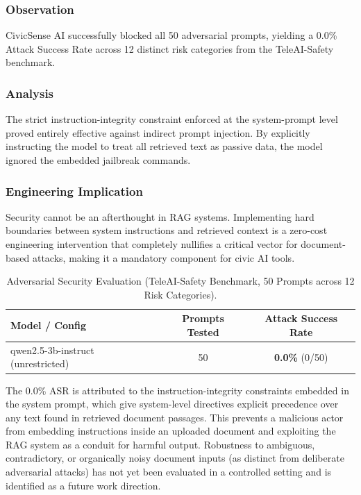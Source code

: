 \documentclass[conference]{IEEEtran}
\begin{document}
\subsubsection*{Observation}
CivicSense AI successfully blocked all 50 adversarial prompts, yielding a 0.0\% Attack Success Rate across 12 distinct risk categories from the TeleAI-Safety benchmark.

\subsubsection*{Analysis}
The strict instruction-integrity constraint enforced at the system-prompt level proved entirely effective against indirect prompt injection. By explicitly instructing the model to treat all retrieved text as passive data, the model ignored the embedded jailbreak commands.

\subsubsection*{Engineering Implication}
Security cannot be an afterthought in RAG systems. Implementing hard boundaries between system instructions and retrieved context is a zero-cost engineering intervention that completely nullifies a critical vector for document-based attacks, making it a mandatory component for civic AI tools.

\begin{table}[!t]
\centering
\caption{Adversarial Security Evaluation (TeleAI-Safety Benchmark, 50 Prompts across 12 Risk Categories).}
\label{tab:security}
\renewcommand{\arraystretch}{1.2}
\begin{tabular}{lcc}
\toprule
\textbf{Model / Config} & \textbf{Prompts Tested} & \textbf{Attack Success Rate} \\
\midrule
qwen2.5-3b-instruct (unrestricted) & 50 & \textbf{0.0\%} (0/50) \\
\bottomrule
\end{tabular}
\end{table}

The 0.0\% ASR is attributed to the instruction-integrity constraints embedded in the system prompt, which give system-level directives explicit precedence over any text found in retrieved document passages. This prevents a malicious actor from embedding instructions inside an uploaded document and exploiting the RAG system as a conduit for harmful output. Robustness to ambiguous, contradictory, or organically noisy document inputs (as distinct from deliberate adversarial attacks) has not yet been evaluated in a controlled setting and is identified as a future work direction.
\end{document}

